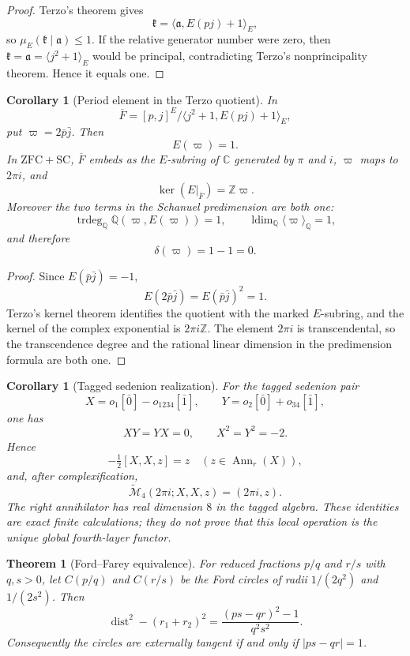 \documentclass[11pt]{article}
\newtheorem{theorem}[definition]{Theorem}
\newtheorem{corollary}[definition]{Corollary}
\newcommand{\Z}{\mathbb Z}
\newcommand{\Q}{\mathbb Q}
\newcommand{\C}{\mathbb C}
\newcommand{\Ann}{\operatorname{Ann}}
\newcommand{\trdeg}{\operatorname{trdeg}}
\newcommand{\ldim}{\operatorname{ldim}}
\begin{document}
\begin{proof}
Terzo's theorem gives
\[
\mathfrak k=\langle\mathfrak a,E(pj)+1\rangle_E,
\]
so $\mu_E(\mathfrak k\mid\mathfrak a)\le1$.  If the relative generator number were zero, then $\mathfrak k=\mathfrak a=\langle j^2+1\rangle_E$ would be principal, contradicting Terzo's nonprincipality theorem.  Hence it equals one.
\end{proof}

\begin{corollary}[Period element in the Terzo quotient]
In
\[
\overline F=[p,j]^E/\langle j^2+1,E(pj)+1\rangle_E,
\]
put $\varpi=2\bar p\bar j$.  Then
\[
E(\varpi)=1.
\]
In $\mathrm{ZFC}+\mathrm{SC}$, $\overline F$ embeds as the $E$-subring of $\C$ generated by $\pi$ and $i$, $\varpi$ maps to $2\pi i$, and
\[
\ker(E|_{\overline F})=\Z\varpi.
\]
Moreover the two terms in the Schanuel predimension are both one:
\[
\trdeg_{\Q}\Q(\varpi,E(\varpi))=1,
\qquad
\ldim_{\Q}\langle\varpi\rangle_{\Q}=1,
\]
and therefore
\[
\delta(\varpi)=1-1=0.
\]
\end{corollary}

\begin{proof}
Since $E(\bar p\bar j)=-1$,
\[
E(2\bar p\bar j)=E(\bar p\bar j)^2=1.
\]
Terzo's kernel theorem identifies the quotient with the marked $E$-subring, and the kernel of the complex exponential is $2\pi i\Z$.  The element $2\pi i$ is transcendental, so the transcendence degree and the rational linear dimension in the predimension formula are both one.
\end{proof}

\begin{corollary}[Tagged sedenion realization]
For the tagged sedenion pair
\[
X=o_1[\bar0]-o_{1234}[\bar1],
\qquad
Y=o_2[\bar0]+o_{34}[\bar1],
\]
one has
\[
XY=YX=0,\qquad X^2=Y^2=-2.
\]
Hence
\[
-\tfrac12[X,X,z]=z\quad(z\in\Ann_r(X)),
\]
and, after complexification,
\[
\widetilde{\mathcal M}_4(2\pi i;X,X,z)=(2\pi i,z).
\]
The right annihilator has real dimension $8$ in the tagged algebra.  These identities are exact finite calculations; they do not prove that this local operation is the unique global fourth-layer functor.
\end{corollary}

\begin{theorem}[Ford--Farey equivalence]
For reduced fractions $p/q$ and $r/s$ with $q,s>0$, let $C(p/q)$ and $C(r/s)$ be the Ford circles of radii $1/(2q^2)$ and $1/(2s^2)$.  Then
\[
\operatorname{dist}^2-(r_1+r_2)^2
=
\frac{(ps-qr)^2-1}{q^2s^2}.
\]
Consequently the circles are externally tangent if and only if $|ps-qr|=1$.
\end{theorem}
\end{document}
